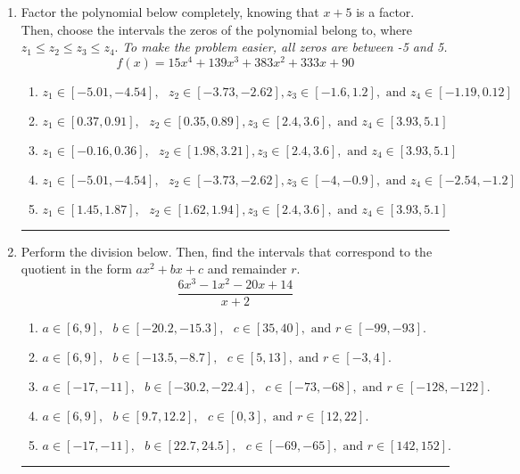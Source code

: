 \documentclass[14pt]{extbook}
\newcommand{\litem}[1]{\item#1\hspace*{-1cm}\rule{\textwidth}{0.4pt}}
\begin{document}
\begin{enumerate}
{\begin{enumerate}[label=\Alph*.]
\end{enumerate} }
\litem{
Factor the polynomial below completely, knowing that $x + 5$ is a factor. Then, choose the intervals the zeros of the polynomial belong to, where $z_1 \leq z_2 \leq z_3 \leq z_4$. \textit{To make the problem easier, all zeros are between -5 and 5.}\[ f(x) = 15x^{4} +139 x^{3} +383 x^{2} +333 x + 90 \]\begin{enumerate}[label=\Alph*.]
\item \( z_1 \in [-5.01, -4.54], \text{   }  z_2 \in [-3.73, -2.62], z_3 \in [-1.6, 1.2], \text{   and   } z_4 \in [-1.19, 0.12] \)
\item \( z_1 \in [0.37, 0.91], \text{   }  z_2 \in [0.35, 0.89], z_3 \in [2.4, 3.6], \text{   and   } z_4 \in [3.93, 5.1] \)
\item \( z_1 \in [-0.16, 0.36], \text{   }  z_2 \in [1.98, 3.21], z_3 \in [2.4, 3.6], \text{   and   } z_4 \in [3.93, 5.1] \)
\item \( z_1 \in [-5.01, -4.54], \text{   }  z_2 \in [-3.73, -2.62], z_3 \in [-4, -0.9], \text{   and   } z_4 \in [-2.54, -1.2] \)
\item \( z_1 \in [1.45, 1.87], \text{   }  z_2 \in [1.62, 1.94], z_3 \in [2.4, 3.6], \text{   and   } z_4 \in [3.93, 5.1] \)

\end{enumerate} }
\litem{
Perform the division below. Then, find the intervals that correspond to the quotient in the form $ax^2+bx+c$ and remainder $r$.\[ \frac{6x^{3} -1 x^{2} -20 x + 14}{x + 2} \]\begin{enumerate}[label=\Alph*.]
\item \( a \in [6, 9], \text{   } b \in [-20.2, -15.3], \text{   } c \in [35, 40], \text{   and   } r \in [-99, -93]. \)
\item \( a \in [6, 9], \text{   } b \in [-13.5, -8.7], \text{   } c \in [5, 13], \text{   and   } r \in [-3, 4]. \)
\item \( a \in [-17, -11], \text{   } b \in [-30.2, -22.4], \text{   } c \in [-73, -68], \text{   and   } r \in [-128, -122]. \)
\item \( a \in [6, 9], \text{   } b \in [9.7, 12.2], \text{   } c \in [0, 3], \text{   and   } r \in [12, 22]. \)
\item \( a \in [-17, -11], \text{   } b \in [22.7, 24.5], \text{   } c \in [-69, -65], \text{   and   } r \in [142, 152]. \)


\end{enumerate}}
\end{enumerate}
\end{document}
